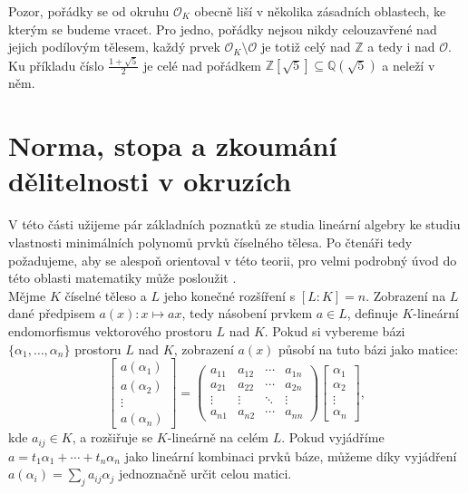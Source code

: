\documentclass [12pt]{report}
\begin{document}
Pozor, pořádky se od okruhu $\mathcal{O}_K$ obecně liší v několika zásadních oblastech, ke kterým se budeme vracet. Pro jedno, pořádky nejsou nikdy celouzavřené nad jejich podílovým tělesem, každý prvek $\mathcal{O}_K \setminus \mathcal{O}$ je totiž celý nad $\mathbb{Z}$ a tedy i nad $\mathcal{O}$. Ku příkladu číslo $\frac{1+\sqrt{5}}{2}$ je celé nad pořádkem $\mathbb{Z}[\sqrt{5}] \subseteq \mathbb{Q}(\sqrt{5})$ a neleží v něm.

\section{Norma, stopa a zkoumání dělitelnosti v okruzích}

V této části užijeme pár základních poznatků ze studia lineární algebry ke studiu vlastnosti minimálních polynomů prvků číselného tělesa. Po čtenáři tedy požadujeme, aby se alespoň  orientoval v této teorii, pro velmi podrobný úvod do této oblasti matematiky může posloužit \cite{Johnson}.\\

Mějme $K$ číselné těleso a $L$ jeho konečné rozšíření s $[L:K] = n$. Zobrazení na $L$ dané předpisem $a(x) : x \mapsto ax$, tedy násobení prvkem $a \in L$, definuje $K$-lineární endomorfismus vektorového prostoru $L$ nad $K$. Pokud si vybereme bázi $\lbrace \alpha_1,\dots,\alpha_n \rbrace$ prostoru $L$ nad $K$, zobrazení $a(x)$ působí na tuto bázi jako matice:
\begin{equation*}
\begin{bmatrix}
a(\alpha_1) \\
a(\alpha_2) \\
\vdots\\
a(\alpha_n)
\end{bmatrix} = \begin{pmatrix}
a_{11} & a_{12} & \cdots & a_{1n}\\
a_{21} & a_{22} & \cdots & a_{2n}\\
\vdots & \vdots & \ddots &\vdots\\
a_{n1} & a_{n2} & \cdots& a_{nn}
\end{pmatrix} \begin{bmatrix}
\alpha_1 \\
\alpha_2 \\
\vdots\\
\alpha_n
\end{bmatrix},
\end{equation*}
kde $a_{ij} \in K$, a rozšiřuje se $K$-lineárně na celém $L$. Pokud vyjádříme $a = t_1 \alpha_1 + \cdots + t_n \alpha_n$ jako lineární kombinaci prvků báze, můžeme díky vyjádření $a(\alpha_i) = \sum_j a_{ij} \alpha_{j}$ jednoznačně určit celou matici.\\
\end{document}
